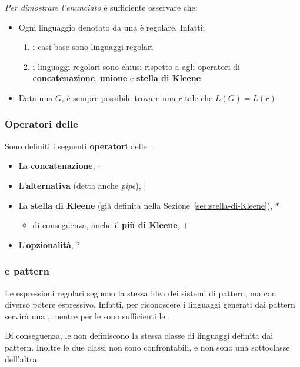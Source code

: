 \documentclass[italian, 10pt]{article}
\begin{document}
\bigskip
\textit{Per dimostrare l'enunciato} è sufficiente osservare che:

\begin{itemize}
  \item Ogni linguaggio denotato da una \RE è regolare. Infatti:
        \begin{enumerate}
          \item i casi base sono linguaggi regolari
          \item i linguaggi regolari sono chiusi rispetto a agli operatori di \textbf{concatenazione}, \textbf{unione} e \textbf{stella di Kleene}
        \end{enumerate}
  \item Data una \RG \(G\), è sempre possibile trovare una \RE \(r\) tale che \(L(G) = L(r)\)
\end{itemize}

\subsubsection{Operatori delle \RE}

Sono definiti i seguenti \textbf{operatori} delle \RE:

\begin{itemize}
  \item La \textbf{concatenazione}, \(\cdot\)
  \item L'\textbf{alternativa} (detta anche \textit{pipe}), \(|\)
  \item La \textbf{stella di Kleene} (già definita nella Sezione~\ref{sec:stella-di-Kleene}), \(\ast\)
        \begin{itemize}[label=\(\rightarrow\)]
          \item di conseguenza, anche il \textbf{più di Kleene}, \(+\)
        \end{itemize}
  \item L'\textbf{opzionalità}, \(?\)
\end{itemize}

\subsubsection{\RE e pattern}

Le espressioni regolari seguono la stessa idea dei sistemi di pattern, ma con diverso potere espressivo.
Infatti, per riconoscere i linguaggi generati dai pattern servirà una \TM, mentre per le \RE sono sufficienti le \FSA.

Di conseguenza, le \RE non definiscono la stessa classe di linguaggi definita dai pattern.
Inoltre le due classi non sono confrontabili, e non sono una sottoclasse dell'altra.
\end{document}
